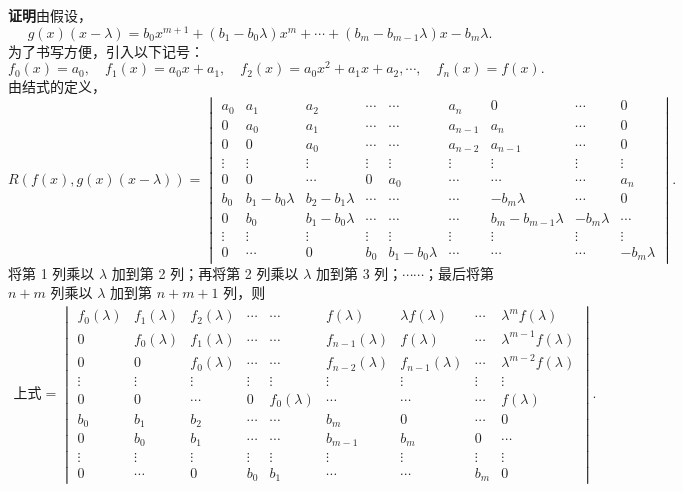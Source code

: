 \documentclass[UTF8,12pt,a4paper,fontset=fandol]{ctexart}
\begin{document}
\noindent\textbf{证明}\quad 由假设，
\[
g(x)(x-\lambda)=b_0x^{m+1}+(b_1-b_0\lambda)x^m+\cdots+(b_m-b_{m-1}\lambda)x-b_m\lambda.
\]
为了书写方便，引入以下记号：
\[
f_0(x)=a_0,\quad f_1(x)=a_0x+a_1,\quad f_2(x)=a_0x^2+a_1x+a_2,\cdots,\quad f_n(x)=f(x).
\]
由结式的定义，
\[
R(f(x),g(x)(x-\lambda))=
\begin{vmatrix}
a_0&a_1&a_2&\cdots&\cdots&a_n&0&\cdots&0\\
0&a_0&a_1&\cdots&\cdots&a_{n-1}&a_n&\cdots&0\\
0&0&a_0&\cdots&\cdots&a_{n-2}&a_{n-1}&\cdots&0\\
\vdots&\vdots&\vdots&\vdots&\vdots&\vdots&\vdots&\vdots&\vdots\\
0&0&\cdots&0&a_0&\cdots&\cdots&\cdots&a_n\\
b_0&b_1-b_0\lambda&b_2-b_1\lambda&\cdots&\cdots&\cdots&-b_m\lambda&\cdots&0\\
0&b_0&b_1-b_0\lambda&\cdots&\cdots&\cdots&b_m-b_{m-1}\lambda&-b_m\lambda&\cdots\\
\vdots&\vdots&\vdots&\vdots&\vdots&\vdots&\vdots&\vdots&\vdots\\
0&\cdots&0&b_0&b_1-b_0\lambda&\cdots&\cdots&\cdots&-b_m\lambda
\end{vmatrix}.
\]
将第 1 列乘以 $\lambda$ 加到第 2 列；再将第 2 列乘以 $\lambda$ 加到第 3 列；$\cdots\cdots$；最后将第 $n+m$ 列乘以 $\lambda$ 加到第 $n+m+1$ 列，则
\[
\begin{aligned}
\text{上式}=
\begin{vmatrix}
f_0(\lambda)&f_1(\lambda)&f_2(\lambda)&\cdots&\cdots&f(\lambda)&\lambda f(\lambda)&\cdots&\lambda^mf(\lambda)\\
0&f_0(\lambda)&f_1(\lambda)&\cdots&\cdots&f_{n-1}(\lambda)&f(\lambda)&\cdots&\lambda^{m-1}f(\lambda)\\
0&0&f_0(\lambda)&\cdots&\cdots&f_{n-2}(\lambda)&f_{n-1}(\lambda)&\cdots&\lambda^{m-2}f(\lambda)\\
\vdots&\vdots&\vdots&\vdots&\vdots&\vdots&\vdots&\vdots&\vdots\\
0&0&\cdots&0&f_0(\lambda)&\cdots&\cdots&\cdots&f(\lambda)\\
b_0&b_1&b_2&\cdots&\cdots&b_m&0&\cdots&0\\
0&b_0&b_1&\cdots&\cdots&b_{m-1}&b_m&0&\cdots\\
\vdots&\vdots&\vdots&\vdots&\vdots&\vdots&\vdots&\vdots&\vdots\\
0&\cdots&0&b_0&b_1&\cdots&\cdots&b_m&0
\end{vmatrix}.
\end{aligned}
\]
\end{document}
